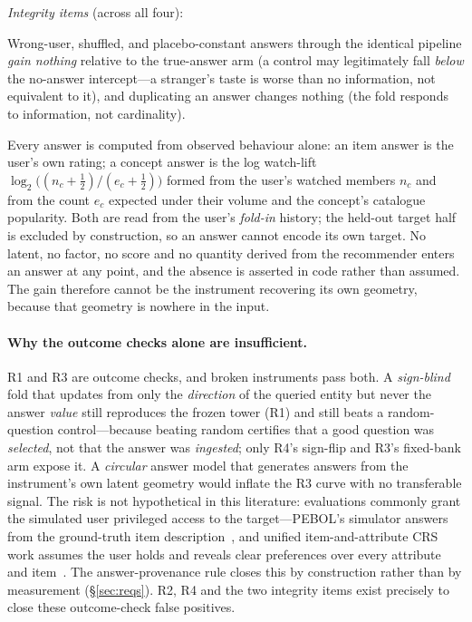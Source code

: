 \documentclass[11pt]{article}
\begin{document}
\emph{Integrity items} (across all four):
\begin{description}[leftmargin=2.4em,itemsep=1.5pt]
  \item[Existential controls.] Wrong-user, shuffled, and placebo-constant answers through the identical
        pipeline \emph{gain nothing} relative to the true-answer arm (a control may legitimately fall \emph{below}
        the no-answer intercept---a stranger's taste is worse than no information, not equivalent to it), and
        duplicating an answer changes nothing (the fold responds to information, not cardinality).
  \item[No recommender geometry in answers.] Every answer is computed from observed behaviour alone: an
        item answer is the user's own rating; a concept answer is the log watch-lift
        $\log_2\!\big((n_c+\tfrac12)/(e_c+\tfrac12)\big)$ formed from the user's watched members
        $n_c$ and from the count $e_c$ expected under their volume and the concept's catalogue popularity. Both are read from the
        user's \emph{fold-in} history; the held-out target half is excluded by construction, so an answer cannot
        encode its own target. No latent, no factor, no score and no quantity derived from the recommender enters
        an answer at any point, and the absence is asserted in code rather than assumed. The gain therefore cannot
        be the instrument recovering its own geometry, because that geometry is nowhere in the input.
\end{description}

\paragraph{Why the outcome checks alone are insufficient.}
R1 and R3 are outcome checks, and broken instruments pass both. A \emph{sign-blind} fold that
updates from only the \emph{direction} of the queried entity but never the answer \emph{value} still
reproduces the frozen tower (R1) and still beats a
random-question control---because beating random certifies that a good question was \emph{selected}, not that the
answer was \emph{ingested}; only R4's sign-flip and R3's fixed-bank arm expose it. A
\emph{circular} answer model that generates answers from the instrument's own latent geometry would inflate the R3
curve with no transferable signal. The risk is not hypothetical in this literature: evaluations commonly grant the
simulated user privileged access to the target---PEBOL's simulator answers from the ground-truth item
description~\cite{austin2024bayesian}, and unified item-and-attribute CRS work assumes the user holds and reveals
clear preferences over every attribute and item~\cite{deng2021unicorn}. The answer-provenance rule closes this by construction rather than
by measurement (\S\ref{sec:reqs}). R2, R4 and the two integrity items exist precisely to close these
outcome-check false positives.
\end{document}
